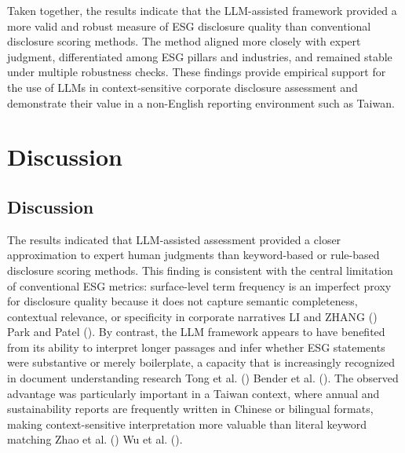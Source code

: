 \documentclass[
  12pt,
]{article}
\begin{document}
Taken together, the results indicate that the LLM-assisted framework
provided a more valid and robust measure of ESG disclosure quality than
conventional disclosure scoring methods. The method aligned more closely
with expert judgment, differentiated among ESG pillars and industries,
and remained stable under multiple robustness checks. These findings
provide empirical support for the use of LLMs in context-sensitive
corporate disclosure assessment and demonstrate their value in a
non-English reporting environment such as Taiwan.

\section{Discussion}\label{discussion}

\subsection{Discussion}\label{discussion-1}

The results indicated that LLM-assisted assessment provided a closer
approximation to expert human judgments than keyword-based or rule-based
disclosure scoring methods. This finding is consistent with the central
limitation of conventional ESG metrics: surface-level term frequency is
an imperfect proxy for disclosure quality because it does not capture
semantic completeness, contextual relevance, or specificity in corporate
narratives LI and ZHANG () Park and Patel
(). By contrast, the LLM framework appears
to have benefited from its ability to interpret longer passages and
infer whether ESG statements were substantive or merely boilerplate, a
capacity that is increasingly recognized in document understanding
research Tong et al. () Bender et al.
(). The observed advantage was
particularly important in a Taiwan context, where annual and
sustainability reports are frequently written in Chinese or bilingual
formats, making context-sensitive interpretation more valuable than
literal keyword matching Zhao et al. () Wu
et al. ().
\end{document}
